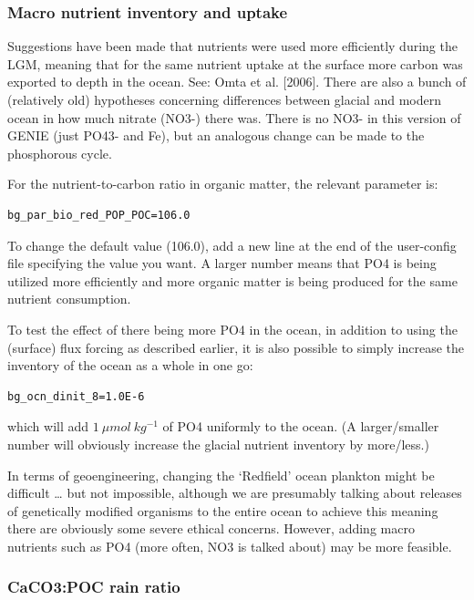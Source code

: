 \documentclass[11pt,fleqn]{book} %
\begin{document}
\subsubsection*{Macro nutrient inventory and uptake}

Suggestions have been made that nutrients were used more efficiently during the LGM, meaning that for the same nutrient uptake at the surface more carbon was exported to depth in the ocean. See: Omta et al. [2006]. There are also a bunch of (relatively old) hypotheses concerning differences between glacial and modern ocean in how much nitrate (NO3-) there was. There is no NO3- in this version of GENIE (just PO43- and Fe), but an analogous change can be made to the phosphorous cycle.

For the nutrient-to-carbon ratio in organic matter, the relevant parameter is:
\small\begin{verbatim}
bg_par_bio_red_POP_POC=106.0
\end{verbatim}\normalsize
To change the default value (106.0), add a new line at the end of the user-config file specifying the value you want. A larger number means that PO4 is being utilized more efficiently and more organic matter is being produced for the same nutrient consumption.

To test the effect of there being more PO4 in the ocean, in addition to using the (surface) flux forcing as described earlier, it is also possible to simply increase the inventory of the ocean as a whole in one go:
\small\begin{verbatim}
bg_ocn_dinit_8=1.0E-6
\end{verbatim}\normalsize
which will add \(1\:\mu mol\:kg^{-1}\) of PO4 uniformly to the ocean. (A larger/smaller number will obviously increase the glacial nutrient inventory by more/less.)

In terms of geoengineering, changing the ‘Redfield’ ocean plankton might be difficult … but not impossible, although we are presumably talking about releases of genetically modified organisms to the entire ocean to achieve this meaning there are obviously some severe ethical concerns. However, adding macro nutrients such as PO4 (more often, NO3 is talked about) may be more feasible.

\subsubsection*{CaCO3:POC rain ratio}
\end{document}

